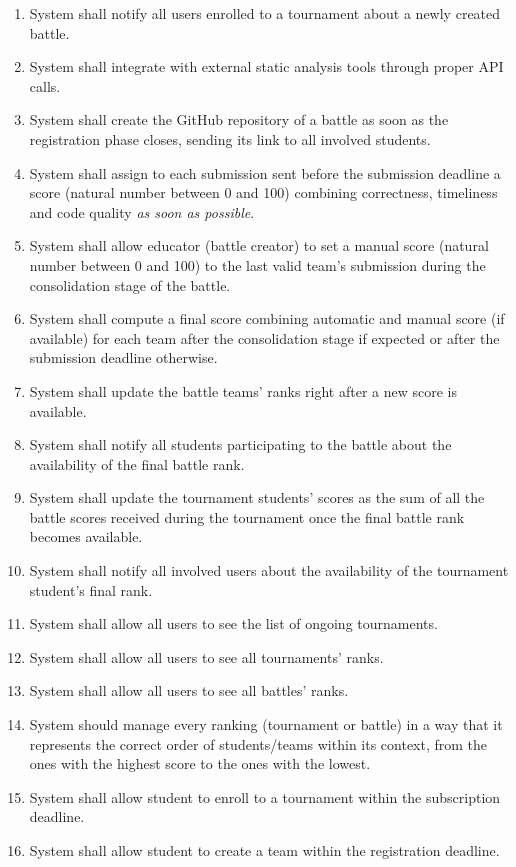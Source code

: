 \begin{enumerate}[label=$\bullet$ \textbf{R\arabic*:}]
    \item System shall notify all users enrolled to a tournament about a newly created battle.
    \item System shall integrate with external static analysis tools through proper API calls.
    \item System shall create the GitHub repository of a battle as soon as the registration phase closes, sending its link to all involved students.
    \item System shall assign to each submission sent before the submission deadline a score (natural number between 0 and 100) combining correctness, timeliness and code quality \textit{as soon as possible}.
    \item System shall allow educator (battle creator) to set a manual score (natural number between 0 and 100) to the last valid team’s submission during the consolidation stage of the battle.
    \item System shall compute a final score combining automatic and manual score (if available) for each team after the consolidation stage if expected or after the submission deadline otherwise.
    \item System shall update the battle teams’ ranks right after a new score is available.
    \item System shall notify all students participating to the battle about the availability of the final battle rank.
    \item System shall update the tournament students’ scores as the sum of all the battle scores received during the tournament once the final battle rank becomes available.
    \item System shall notify all involved users about the availability of the tournament student’s final rank.
    \item System shall allow all users to see the list of ongoing tournaments.
    \item System shall allow all users to see all tournaments’ ranks.
    \item System shall allow all users to see all battles' ranks.
    \item System should manage every ranking (tournament or battle) in a way that it represents the correct order of students/teams within its context, from the ones with the highest score to the ones with the lowest.
    \item System shall allow student to enroll to a tournament within the subscription deadline.
    \item System shall allow student to create a team within the registration deadline.

\end{enumerate}
